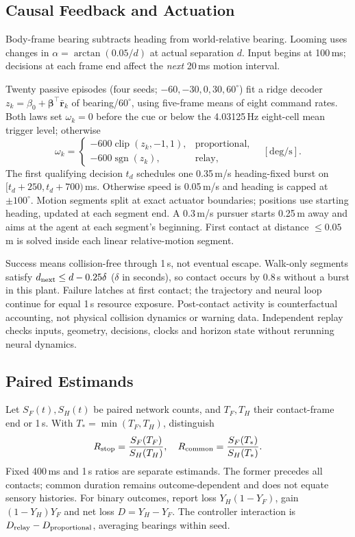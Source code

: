 \subsection{Causal Feedback and Actuation}
Body-frame bearing subtracts heading from world-relative bearing. Looming uses changes in $\alpha=\arctan(0.05/d)$ at actual separation $d$. Input begins at 100\,ms; decisions at each frame end affect the \emph{next} 20\,ms motion interval.

Twenty passive episodes (four seeds; $-60,-30,0,30,60^\circ$) fit a ridge decoder $z_k=\beta_0+\boldsymbol\beta^\top\bar{\mathbf r}_k$ of bearing/$60^\circ$, using five-frame means of eight command rates. Both laws set $\omega_k=0$ before the cue or below the 4.03125\,Hz eight-cell mean trigger level; otherwise
\begin{equation}
\omega_k=\begin{cases}
-600\operatorname{clip}(z_k,-1,1),&\text{proportional},\\
-600\operatorname{sgn}(z_k),&\text{relay},
\end{cases}\quad[\mathrm{deg/s}].
\end{equation}
The first qualifying decision $t_d$ schedules one 0.35\,m/s heading-fixed burst on $[t_d+250,t_d+700)$\,ms. Otherwise speed is 0.05\,m/s and heading is capped at $\pm100^\circ$. Motion segments split at exact actuator boundaries; positions use starting heading, updated at each segment end. A 0.3\,m/s pursuer starts 0.25\,m away and aims at the agent at each segment's beginning. First contact at distance $\leq0.05$\,m is solved inside each linear relative-motion segment.

Success means collision-free through 1\,s, not eventual escape. Walk-only segments satisfy $d_{\rm next}\leq d-0.25\delta$ ($\delta$ in seconds), so contact occurs by 0.8\,s without a burst in this plant. Failure latches at first contact; the trajectory and neural loop continue for equal 1\,s resource exposure. Post-contact activity is counterfactual accounting, not physical collision dynamics or warning data. Independent replay checks inputs, geometry, decisions, clocks and horizon state without rerunning neural dynamics.

\subsection{Paired Estimands}
Let $S_F(t),S_H(t)$ be paired network counts, and $T_F,T_H$ their contact-frame end or 1\,s. With $T_*=\min(T_F,T_H)$, distinguish
\begin{equation}
R_{\rm stop}=\frac{S_F(T_F)}{S_H(T_H)},\quad
R_{\rm common}=\frac{S_F(T_*)}{S_H(T_*)}.
\end{equation}
Fixed 400\,ms and 1\,s ratios are separate estimands. The former precedes all contacts; common duration remains outcome-dependent and does not equate sensory histories. For binary outcomes, report loss $Y_H(1-Y_F)$, gain $(1-Y_H)Y_F$ and net loss $D=Y_H-Y_F$. The controller interaction is $D_{\rm relay}-D_{\rm proportional}$, averaging bearings within seed.

